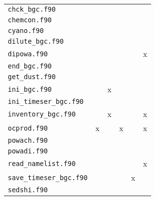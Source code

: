 \documentclass[11pt,a4paper,fleqn,twoside]{article}
\begin{document}
\begin{appendix}
\begin{tabular}{|l|c|c|c|c|c|}
{\tt  chck\_bgc.f90        }    &           &              &                    &               &                   \\
{\tt  chemcon.f90          }    &           &              &                    &               &                   \\
{\tt  cyano.f90           }     &           &              &                    &               &                   \\ \hline
{\tt  dilute\_bgc.f90      }    &           &              &                    &               &                   \\
{\tt  dipowa.f90          }     &           &              &                    &               &        x          \\ \hline
{\tt  end\_bgc.f90         }    &           &              &                    &               &                   \\ \hline
{\tt  get\_dust.f90      }      &           &              &                    &               &                   \\ \hline
{\tt  ini\_bgc.f90         }    &           &    x         &                    &               &                   \\
{\tt  ini\_timeser\_bgc.f90 }   &           &              &                    &               &                   \\
{\tt  inventory\_bgc.f90 }      &           &    x         &                    &               &        x          \\ \hline
{\tt  ocprod.f90          }     &     x     &              &         x          &               &        x          \\ \hline
{\tt  powach.f90          }     &           &              &                    &               &                   \\
{\tt  powadi.f90          }     &           &              &                    &               &                   \\ \hline
{\tt  read\_namelist.f90   }    &           &              &                    &               &        x          \\ \hline
{\tt  save\_timeser\_bgc.f90}   &           &              &                    &       x       &                   \\
{\tt  sedshi.f90          }     &           &              &                    &               &                   \\ \hline

\end{tabular}
\end{appendix}
\end{document}
